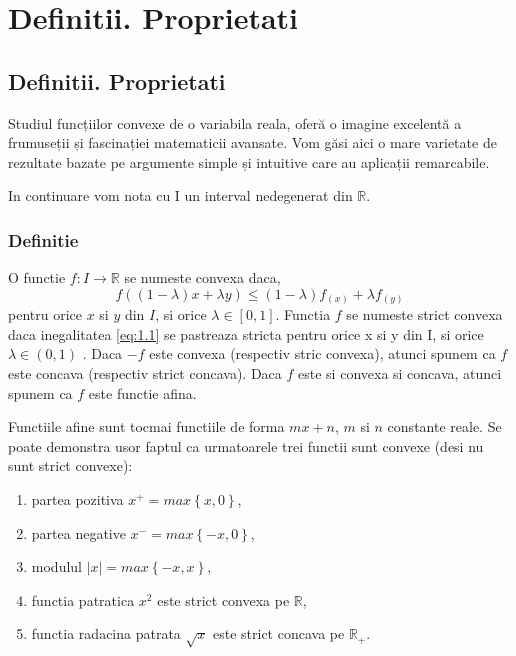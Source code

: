 \documentclass[a4paper,12pt,oneside]{report}
\begin{document}
\maketitle

\tableofcontents

%
%
%
%
\chapter{Definitii. Proprietati}

\section{Definitii. Proprietati}

Studiul funcțiilor convexe de o variabila reala, oferă o imagine excelentă a frumuseții și fascinației matematicii avansate. Vom găsi aici o mare varietate de rezultate bazate pe argumente simple și intuitive care au aplicații remarcabile.

In continuare vom nota cu I un interval nedegenerat din \(\mathbb{R}\).

\subsection{Definitie}

O functie \(f: I \rightarrow \mathbb{R}\) se numeste convexa daca,
\begin{displaymath}
f \left ( \left ( 1 - \lambda  \right )x + \lambda y \right )\leq \left ( 1 - \lambda  \right ) f_{\left ( x \right )} + \lambda f_{\left ( y \right )} 	\label{eq:1.1} \tag{1.1}
\end{displaymath}
pentru orice \(x\) si \(y\) din \(I\), si orice \(\lambda \in \left [ 0,1 \right ]\). Functia \(f\) se numeste strict convexa daca inegalitatea \ref{eq:1.1} se pastreaza  stricta pentru orice x si y din I, si orice  \(\lambda \in \left ( 0,1 \right )\) . Daca \(-f\) este convexa (respectiv stric convexa), atunci spunem ca \(f\) este concava (respectiv strict concava). Daca \(f\) este si convexa si concava, atunci spunem ca \(f\) este functie afina. 


Functiile afine sunt tocmai functiile de forma \(mx + n\),  \(m\) si \(n\) constante reale.
Se poate demonstra usor faptul ca urmatoarele trei functii sunt convexe (desi nu sunt strict convexe):
\begin{enumerate}
  \item partea pozitiva \(x^{+} = max \left \{ x,0 \right \}\),
  \item partea negative \(x^{-} = max \left \{ -x,0 \right \}\), 
  \item modulul \(\left | x \right | = max \left \{ -x,x \right \}\),
  \item functia patratica \(x^{2}\)  este strict convexa pe \(\mathbb{R}\),
  \item functia radacina patrata \(\sqrt{x}\) este strict concava pe \(\mathbb{R}_{+}\). 
\end{enumerate}
\end{document}
